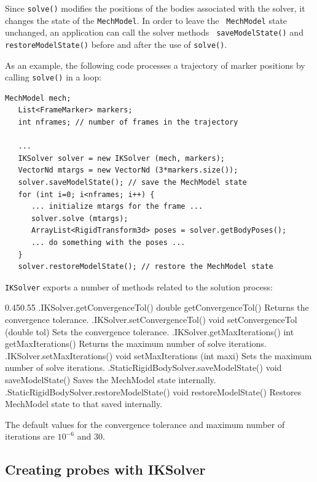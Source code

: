 \begin{sideblock}
Since {\tt solve()} modifies the positions of the bodies associated with the
solver, it changes the state of the {\tt MechModel}. In order to leave the {\tt
MechModel} state unchanged, an application can call the solver methods {\tt
saveModelState()} and {\tt restoreModelState()} before and after the use of
{\tt solve()}.
\end{sideblock}

As an example, the following code processes a trajectory of marker positions by
calling {\tt solve()} in a loop:
%
\begin{lstlisting}[]
   MechModel mech;
   List<FrameMarker> markers;
   int nframes; // number of frames in the trajectory

   ...
   IKSolver solver = new IKSolver (mech, markers);
   VectorNd mtargs = new VectorNd (3*markers.size());
   solver.saveModelState(); // save the MechModel state
   for (int i=0; i<nframes; i++) {
      ... initialize mtargs for the frame ...
      solver.solve (mtargs);
      ArrayList<RigidTransform3d> poses = solver.getBodyPoses();
      ... do something with the poses ...
   }
   solver.restoreModelState(); // restore the MechModel state
\end{lstlisting}
%

{\tt IKSolver} exports a number of methods related to the solution process:
%
\begin{methodtable}{0.45}{0.55}
\midline
%
\methodentry
{\probes.IKSolver.getConvergenceTol()}%
{double getConvergenceTol()}%
{Returns the convergence tolerance.}%
%
\methodentry
{\probes.IKSolver.setConvergenceTol()}%
{void setConvergenceTol (double tol)}%
{Sets the convergence tolerance.}%
%
\methodentry
{\probes.IKSolver.getMaxIterations()}%
{int getMaxIterations()}%
{Returns the maximum number of solve iterations.}%
%
\methodentry
{\probes.IKSolver.setMaxIterations()}%
{void setMaxIterations (int maxi)}%
{Sets the maximum number of solve iterations.}%
%
\methodentry
{\mech.StaticRigidBodySolver.saveModelState()}%
{void saveModelState()}%
{Saves the MechModel state internally.}%
%
\methodentry
{\mech.StaticRigidBodySolver.restoreModelState()}%
{void restoreModelState()}%
{Restores MechModel state to that saved internally.}%
%
\midline
\end{methodtable}
%
The default values for the convergence tolerance and maximum number of
iterations are $10^{-6}$ and 30.

\subsection{Creating probes with IKSolver}

